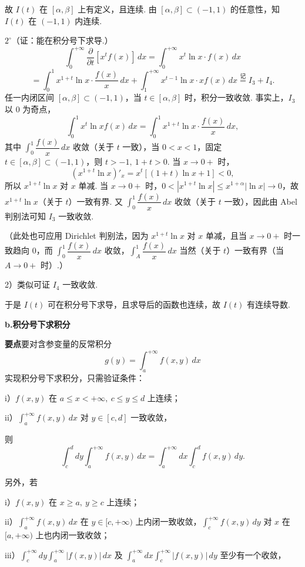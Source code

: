 \documentclass[UTF8, 12pt, fontset=fandol, oneside]{ctexart}
\begin{document}
故 $I(t)$ 在 $[\alpha,\beta]$ 上有定义，且连续. 由 $[\alpha,\beta]\subset(-1,1)$ 的任意性，知 $I(t)$ 在 $(-1,1)$ 内连续.

$2^\circ$（证：能在积分号下求导.）
\[
\int_0^{+\infty}\frac{\partial}{\partial t}[x^tf(x)]\,dx
=\int_0^{+\infty}x^t\ln x\cdot f(x)\,dx
\]
\[
=\int_0^1x^{1+t}\ln x\cdot\frac{f(x)}x\,dx
+\int_1^{+\infty}x^{t-1}\ln x\cdot xf(x)\,dx\overset{\text{记}}{=}I_3+I_4.
\tag{1}
\]
任一内闭区间 $[\alpha,\beta]\subset(-1,1)$，当 $t\in[\alpha,\beta]$ 时，积分一致收敛. 事实上，$I_3$ 以 0 为奇点，
\[
\int_0^1x^t\ln x f(x)\,dx
=\int_0^1x^{1+t}\ln x\cdot\frac{f(x)}x\,dx,
\]
其中 $\displaystyle\int_0^1\dfrac{f(x)}x\,dx$ 收敛（关于 $t$ 一致），当 $0<x<1$，固定 $t\in[\alpha,\beta]\subset(-1,1)$，则 $t>-1,\ 1+t>0$. 当 $x\to0+$ 时，
\[
(x^{1+t}\ln x)'_x=x^t[(1+t)\ln x+1]<0,
\]
所以 $x^{1+t}\ln x$ 对 $x$ 单减. 当 $x\to0+$ 时，$0<|x^{1+t}\ln x|\le x^{1+\alpha}|\ln x|\to0$，故 $x^{1+t}\ln x$（关于 $t$）一致有界. 又 $\displaystyle\int_0^1\dfrac{f(x)}x\,dx$ 收敛（关于 $t$ 一致），因此由 Abel 判别法可知 $I_3$ 一致收敛.

（此处也可应用 Dirichlet 判别法，因为 $x^{1+t}\ln x$ 对 $x$ 单减，且当 $x\to0+$ 时一致趋向 0，而 $\displaystyle\int_0^1\dfrac{f(x)}x\,dx$ 收敛，$\displaystyle\int_A^1\dfrac{f(x)}x\,dx$ 当然（关于 $t$）一致有界（当 $A\to0+$ 时）.）

2）类似可证 $I_4$ 一致收敛.

于是 $I(t)$ 可在积分号下求导，且求导后的函数也连续，故 $I(t)$ 有连续导数.

\noindent\textbf{b.\quad 积分号下求积分}

\noindent\textbf{要点}\quad 要对含参变量的反常积分
\[
g(y)=\int_a^{+\infty}f(x,y)\,dx
\]
实现积分号下求积分，只需验证条件：

i）$f(x,y)$ 在 $a\le x<+\infty,\ c\le y\le d$ 上连续；

ii）$\displaystyle\int_a^{+\infty}f(x,y)\,dx$ 对 $y\in[c,d]$ 一致收敛，

则
\[
\int_c^d dy\int_a^{+\infty}f(x,y)\,dx
=\int_a^{+\infty}dx\int_c^d f(x,y)\,dy.
\]

另外，若

i）$f(x,y)$ 在 $x\ge a,\ y\ge c$ 上连续；

ii）$\displaystyle\int_a^{+\infty}f(x,y)\,dx$ 在 $y\in[c,+\infty)$ 上内闭一致收敛，$\displaystyle\int_c^{+\infty}f(x,y)\,dy$ 对 $x$ 在 $[a,+\infty)$ 上也内闭一致收敛；

iii）$\displaystyle\int_c^{+\infty}dy\int_a^{+\infty}|f(x,y)|\,dx$ 及 $\displaystyle\int_a^{+\infty}dx\int_c^{+\infty}|f(x,y)|\,dy$ 至少有一个收敛，
\end{document}
